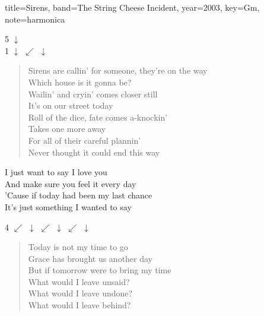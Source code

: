 \documentclass{skrul-leadsheet}
\begin{document}
\begin{song}[transpose-capo=true]{title={Sirens}, band={The String Cheese Incident}, year={2003}, key={Gm}, note={harmonica}}

\begin{intro}
5 $\downarrow$ \\
1 $\downarrow$ $\swarrow$ $\downarrow$
\end{intro}

\begin{verse}
Sirens are callin' for someone, they're on the way \\
Which house is it gonna be? \\
Wailin' and cryin' comes closer still \\
It's on our street today \\
Roll of the dice, fate comes a-knockin' \\
Takes one more away \\
For all of their careful plannin' \\
Never thought it could end this way \\
\end{verse}

\begin{chorus}
I just want to say I love you \\
And make sure you feel it every day  \\
'Cause if today  had been my last chance  \\
It's just something   I wanted to say \\
\end{chorus}

\begin{interlude}
4 $\swarrow$ $\downarrow$ $\swarrow$ $\downarrow$ $\swarrow$ $\downarrow$ \\
\end{interlude}

\begin{verse}
Today is not my time to go \\
Grace has brought us another day \\
But if tomorrow were to bring my time \\
What would I leave unsaid?  \\
What would I leave undone? \\
What would I leave behind?   \\
\end{verse}


\end{song}
\end{document}
